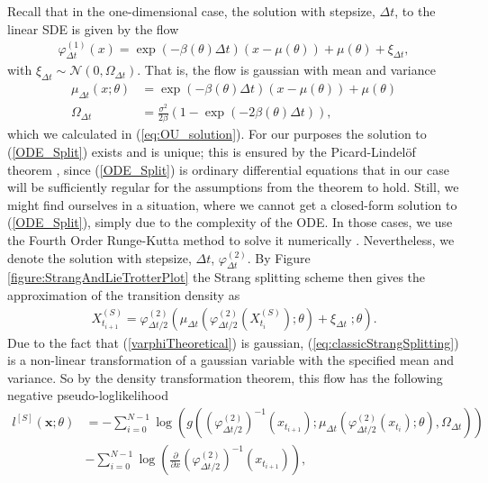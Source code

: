 Recall that in the one-dimensional case, the solution with stepsize, $\Delta t$, to the linear SDE is given by the flow
\begin{align}
    \varphi_{\Delta t}^{(1)}(x) = \exp\left(-\beta\left(\theta\right) \Delta t\right)\left(x - \mu\left(\theta\right)\right) + \mu\left(\theta\right) + \xi_{\Delta t}, \label{varphiTheoretical}
\end{align}
with $\xi_{\Delta t}\sim\mathcal{N}\left(0, \Omega_{\Delta t}\right)$. That is, the flow is gaussian with mean and variance
\begin{align}
    \mu_{\Delta t}(x; \theta) &= \exp\left(-\beta\left(\theta\right) \Delta t\right)\left(x - \mu\left(\theta\right)\right) + \mu\left(\theta\right) \label{linearSDEMean}\\
    \Omega_{\Delta t} &= \frac{\sigma^2}{2\beta}\left(1 - \exp\left(-2\beta\left(\theta\right)\Delta t\right)\right), \label{linearSDEVariance}
\end{align}
which we calculated in (\ref{eq:OU_solution}). For our purposes the solution to (\ref{ODE_Split}) exists and is unique; this is ensured by the Picard-Lindelöf theorem \cite[section 2.7]{Srkk2019}, since (\ref{ODE_Split}) is ordinary differential equations that in our case will be sufficiently regular for the assumptions from the theorem to hold. Still, we might find ourselves in a situation, where we cannot get a closed-form solution to (\ref{ODE_Split}), simply due to the complexity of the ODE. In those cases, we use the Fourth Order Runge-Kutta method to solve it numerically \cite[p.541 equation (8)]{numericalAnalysis}.  
Nevertheless, we denote the solution with stepsize, $\Delta t$, $\varphi_{\Delta t}^{(2)}$. By Figure \ref{figure:StrangAndLieTrotterPlot} the Strang splitting scheme then gives the approximation of the transition density as 
\begin{align}
    X_{t_{i+1}}^{(S)} = \varphi_{\Delta t / 2}^{(2)}\left(\mu_{\Delta t}\left(\varphi_{\Delta t/2}^{(2)}\left(X_{t_{i}}^{(S)}\right); \theta\right) + \xi_{\Delta t} \; ; \theta \right). \label{eq:classicStrangSplitting}
\end{align}
Due to the fact that (\ref{varphiTheoretical}) is gaussian, (\ref{eq:classicStrangSplitting}) is a non-linear transformation of a gaussian variable with the specified mean and variance. So by the density transformation theorem, this flow has the following negative pseudo-loglikelihood 
\begin{align}
    l^{[S]}(\mathbf{x}; \theta) &= -\sum_{i = 0}^{N - 1}\log\left(g\left(\left(\varphi_{\Delta t / 2}^{(2)}\right)^{-1}\left(x_{t_{i+1}}\right); \mu_{\Delta t}\left(\varphi_{\Delta t/2}^{(2)}\left(x_{t_{i}}\right); \theta \right), \Omega_{\Delta t} \right) \right) \nonumber \\
    &- \sum_{i = 0}^{N - 1}\log\left(\frac{\partial}{\partial x}\left(\varphi_{\Delta t / 2}^{(2)}\right)^{-1}\left(x_{t_{i + 1}}\right) \right), \label{eq:Strang_likelihood}
\end{align}

